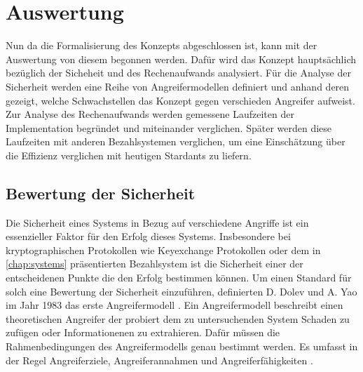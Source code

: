 \documentclass[11pt,a4paper]{scrreprt}
\begin{document}
\chapter{Auswertung}
Nun da die Formalisierung des Konzepts abgeschlossen ist, kann mit der Auswertung von diesem begonnen werden. Dafür wird das Konzept hauptsächlich bezüglich der Sicheheit und des Rechenaufwands analysiert. Für die Analyse der Sicherheit werden eine Reihe von Angreifermodellen definiert und anhand deren gezeigt, welche Schwachstellen das Konzept gegen verschieden Angreifer aufweist. Zur Analyse des Rechenaufwands werden gemessene Laufzeiten der Implementation begründet und miteinander verglichen. Später werden diese Laufzeiten mit anderen Bezahlsystemen verglichen, um eine Einschätzung über die Effizienz verglichen mit heutigen Stardants zu liefern.
\section{Bewertung der Sicherheit}
Die Sicherheit eines Systems in Bezug auf verschiedene Angriffe ist ein essenzieller Faktor für den Erfolg dieses Systems. Insbesondere bei kryptographischen Protokollen wie Keyexchange Protokollen oder dem in \ref{chap:systems} präsentierten Bezahlsystem ist die Sicherheit einer der entscheidenen Punkte die den Erfolg bestimmen können. Um einen Standard für solch eine Bewertung der Sicherheit einzuführen, definierten D. Dolev und A. Yao im Jahr 1983 das erste Angreifermodell \cite{am-dolev1983security}. Ein Angreifermodell beschreibt einen theoretischen Angreifer der probiert dem zu untersuchenden System Schaden zu zufügen oder Informationenen zu extrahieren. Dafür müssen die Rahmenbedingungen des Angreifermodells genau bestimmt werden. Es umfasst in der Regel Angreiferziele, Angreiferannahmen und Angreiferfähigkeiten \cite{am-do2019role}. 
\end{document}
